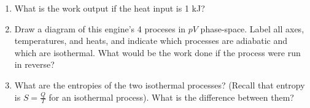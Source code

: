 \documentclass[10pt]{article}
\begin{document}
\begin{enumerate}
\begin{enumerate}
\item What is the work output if the heat input is 1 kJ? \\ \vspace{2cm}
\item Draw a diagram of this engine's 4 proceses in $pV$ phase-space.  Label all axes, temperatures, and heats, and indicate which processes are adiabatic and which are isothermal. What would be the work done if the process were run in reverse? \\ \vspace{4cm}
\item What are the entropies of the two isothermal processes? (Recall that entropy is $S = \frac{Q}{T}$ for an isothermal process).  What is the difference between them?
\end{enumerate}
\end{enumerate}
\end{document}
